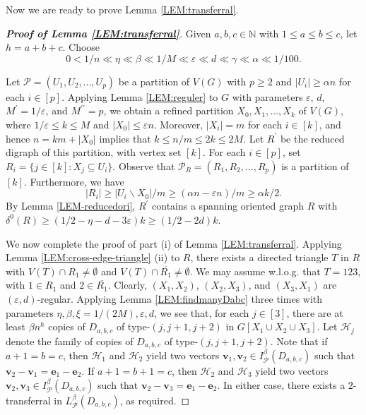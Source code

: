 \documentclass[11pt,a4paper,reqno]{amsart}
\theoremstyle{definition} %
\begin{document}
Now we are ready to prove Lemma \ref{LEM:transferral}. 

\begin{proof}[\textbf{Proof of Lemma \ref{LEM:transferral}}]

Given $a,b,c\in \mathbb{N}$ with $1\leqslant a\leqslant b\leqslant c$, let $h=a+b+c$. Choose
$$0<1/n\ll \eta \ll\beta \ll 1/M \ll\varepsilon\ll d\ll \gamma 
\ll\alpha\ll  1/100. $$ 
    
Let $\mathcal{P}=(U_1,U_2,\ldots,U_p)$ be a partition of $V(G)$ with $p\geqslant 2$ and $|U_i|\geqslant \alpha n$ for each $i\in[p]$.
Applying Lemma \ref{LEM:reguler} to $G$ with parameters $\varepsilon$, $d$, $M^\prime=1/\varepsilon$, and $M^{\prime\prime}=p$, we obtain a refined partition $X_0,X_1,\ldots,X_k$ of $V(G)$, where $1/\varepsilon \leqslant k\leqslant M$ and $|X_0|\leqslant \varepsilon n$. Moreover, $|X_i|=m$ for each $i\in [k]$, and hence $n=km+|X_0|$ implies that
$k\leqslant n/m\leqslant 2k\leqslant 2M$.
Let $R^{\prime}$ be the reduced digraph of this partition, with vertex set $[k]$.
For each $i\in [p]$, set
$R_i=\{j\in [k]: X_j \subseteq U_i\}$.
Observe that $\mathcal{P}_R=(R_1,R_2,\ldots,R_p)$ is a partition of $[k]$. Furthermore, we have
$$|R_i|\geqslant|U_i\backslash X_0|/m\geqslant(\alpha n-\varepsilon n)/m\geqslant\alpha k/2.$$
By Lemma \ref{LEM-reducedori}, $R^{\prime}$ contains a spanning oriented graph $R$ with
$\delta ^0(R)\geqslant (1/2-\eta-d-3\varepsilon )k\geqslant (1/2-2d)k$.

We now complete the proof of part (i) of Lemma \ref{LEM:transferral}. Applying Lemma \ref{LEM:cross-edge-triangle} (ii) to $R$, there exists a directed triangle $T$ in $R$ with
$V(T)\cap R_1\neq\emptyset$ and $V(T)\cap \overline{R_1}\neq\emptyset$. We may  assume w.l.o.g. that $T=123$, with $1\in R_1$ and $2\in \overline{R_1}$.
Clearly, $(X_1,X_2)$, $(X_2,X_3)$, and $(X_3,X_1)$ are $(\varepsilon,d)$-regular.
Applying Lemma \ref{LEM:findmanyDabc} three times with parameters $\eta,\beta,\xi=1/(2M),\varepsilon,d$, we see that, for each $j\in[3]$, there are at least $\beta n^{h}$ copies of $D_{a,b,c}$ of type-$(j,j+1,j+2)$ in $G[X_1\cup X_2\cup X_3]$. Let $\mathcal{H}_j$ denote the family of copies of $D_{a,b,c}$ of type-$(j,j+1,j+2)$. Note that if $a+1=b=c$, then $\mathcal{H}_1$ and $\mathcal{H}_2$ yield two vectors $\mathbf{v}_1,\mathbf{v}_2\in I^{\beta}_\mathcal{P}(D_{a,b,c})$ such that
$\mathbf{v}_2-\mathbf{v}_1=\mathbf{e}_1-\mathbf{e}_2$.
If $a+1=b+1=c$, then $\mathcal{H}_2$ and $\mathcal{H}_3$ yield two vectors $\mathbf{v}_2,\mathbf{v}_3\in I^{\beta}_\mathcal{P}(D_{a,b,c})$ such that
$\mathbf{v}_2-\mathbf{v}_3=\mathbf{e}_1-\mathbf{e}_2$.
In either case, there exists a $2$-transferral in $L^{\beta}_{\mathcal{P}}(D_{a,b,c})$, as required.


\end{proof}
\end{document}
